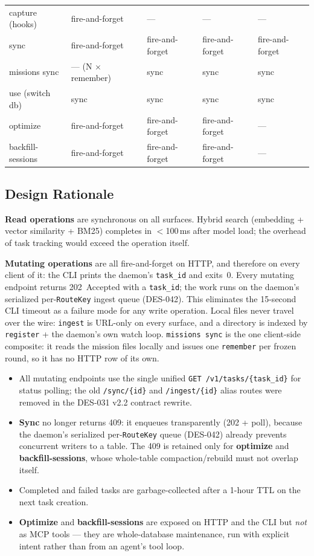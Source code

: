 \documentclass[a4paper,10pt]{article}
\newcommand{\field}[1]{\texttt{#1}}
\begin{document}
\begin{longtable}{l l l l l}
capture (hooks)     & fire-and-forget & ---  & ---  & --- \\
sync                & fire-and-forget & fire-and-forget & fire-and-forget
                    & fire-and-forget \\
missions sync       & --- (N $\times$ remember) & sync & sync & sync \\
use (switch db)     & sync   & sync & sync & sync \\
optimize            & fire-and-forget & fire-and-forget & fire-and-forget & --- \\
backfill-sessions   & fire-and-forget & fire-and-forget & fire-and-forget & --- \\
\end{longtable}

\subsection{Design Rationale}

\textbf{Read operations} are synchronous on all surfaces.  Hybrid
search (embedding + vector similarity + BM25) completes in
$<$100\,ms after model load; the overhead of task tracking would
exceed the operation itself.

\textbf{Mutating operations} are all fire-and-forget on HTTP, and
therefore on every client of it: the CLI prints the daemon's
\field{task\_id} and exits~0.  Every mutating endpoint returns
202~Accepted with a \field{task\_id}; the work runs on the daemon's
serialized per-\texttt{RouteKey} ingest queue (DES-042).  This
eliminates the 15-second CLI timeout as a failure mode for any write
operation.  Local files never travel over the wire: \texttt{ingest} is
URL-only on every surface, and a directory is indexed by
\texttt{register} + the daemon's own watch loop.  \texttt{missions sync}
is the one client-side composite: it reads the mission files locally and
issues one \texttt{remember} per frozen round, so it has no HTTP row of
its own.

\begin{itemize}
  \item All mutating endpoints use the single unified
    \texttt{GET /v1/tasks/\{task\_id\}} for status polling; the old
    \texttt{/sync/\{id\}} and \texttt{/ingest/\{id\}} alias routes were
    removed in the DES-031 v2.2 contract rewrite.
  \item \textbf{Sync} no longer returns 409: it enqueues transparently
    (202 + poll), because the daemon's serialized per-\texttt{RouteKey}
    queue (DES-042) already prevents concurrent writers to a table.  The
    409 is retained only for \textbf{optimize} and
    \textbf{backfill-sessions}, whose whole-table compaction/rebuild
    must not overlap itself.
  \item Completed and failed tasks are garbage-collected after a
    1-hour TTL on the next task creation.
  \item \textbf{Optimize} and \textbf{backfill-sessions} are exposed on
    HTTP and the CLI but \emph{not} as MCP tools --- they are
    whole-database maintenance, run with explicit intent rather than
    from an agent's tool loop.
\end{itemize}
\end{document}
